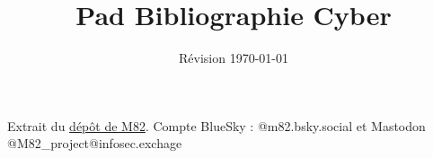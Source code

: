 \documentclass[12pt,a4paper]{article}
\author{Révision \today}
\title{Pad Bibliographie Cyber}
\date{}
\begin{document}
\maketitle
Extrait du \href{https://github.com/M82-project/Bibliography}{dépôt de M82}. Compte BlueSky : @m82.bsky.social et Mastodon @M82_project@infosec.exchage \nocite{*}
\renewcommand{\thepage}{}


\end{document}
